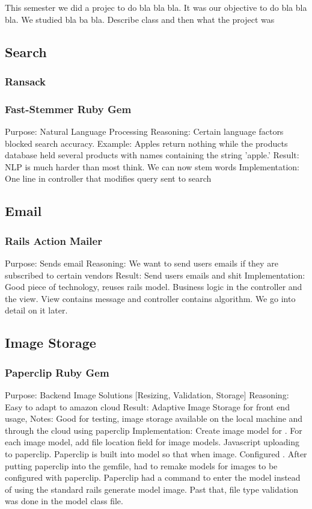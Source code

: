 \documentclass[10pt, a4paper, twocolumn]{article} %
\begin{document}
This semester we did a projec to do bla bla bla. It was our objective to do bla bla bla. We studied bla ba bla. Describe class and then what the project was
\subsection{Search}
\subsubsection{Ransack}
\subsubsection{Fast-Stemmer Ruby Gem}
Purpose: Natural Language Processing
Reasoning: Certain language factors blocked search accuracy. Example: Apples return nothing while the products database held several products with names containing the string 'apple.' 
Result: NLP is much harder than most think. We can now stem words
Implementation: One line in controller that modifies query sent to search
\subsection{Email}
\subsubsection{Rails Action Mailer}
Purpose: Sends email
Reasoning: We want to send users emails if they are subscribed to certain vendors
Result: Send users emails and shit
Implementation: Good piece of technology, reuses rails model. Business logic in the controller and the view. View contains message and controller contains algorithm. We go into detail on it later.
\subsection{Image Storage}
\subsubsection{Paperclip Ruby Gem}
Purpose: Backend Image Solutions [Resizing, Validation, Storage] 
Reasoning: Easy to adapt to amazon cloud
Result: Adaptive Image Storage for front end usage, 
Notes: Good for testing, image storage available on the local machine and through the cloud using paperclip
Implementation: Create image model for . For each image model, add file location field for image models. Javascript uploading to paperclip. Paperclip is built into model so that when image. Configured . After putting paperclip into the gemfile, had to remake models for images to be configured with paperclip. Paperclip had a command to enter the model instead of using the standard rails generate model image. Past that, file type validation was done in the model class file. 
\end{document}
